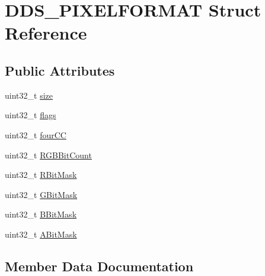 \hypertarget{struct_d_d_s___p_i_x_e_l_f_o_r_m_a_t}{}\section{D\+D\+S\+\_\+\+P\+I\+X\+E\+L\+F\+O\+R\+M\+AT Struct Reference}
\label{struct_d_d_s___p_i_x_e_l_f_o_r_m_a_t}
\subsection*{Public Attributes}
\begin{DoxyCompactItemize}
\item 
uint32\+\_\+t \mbox{\hyperlink{struct_d_d_s___p_i_x_e_l_f_o_r_m_a_t_adb357eb46848e57b8d89b59d31608f6c}{size}}
\item 
uint32\+\_\+t \mbox{\hyperlink{struct_d_d_s___p_i_x_e_l_f_o_r_m_a_t_a1909f63ad2d0a257bf5e8dba9e2d9475}{flags}}
\item 
uint32\+\_\+t \mbox{\hyperlink{struct_d_d_s___p_i_x_e_l_f_o_r_m_a_t_aa7af0012c64480e8eeafa25d7892c310}{four\+CC}}
\item 
uint32\+\_\+t \mbox{\hyperlink{struct_d_d_s___p_i_x_e_l_f_o_r_m_a_t_af53071b3c2912f56e4b54533d8101951}{R\+G\+B\+Bit\+Count}}
\item 
uint32\+\_\+t \mbox{\hyperlink{struct_d_d_s___p_i_x_e_l_f_o_r_m_a_t_a2d2f8c19c50ceb8677b0be2d1090c234}{R\+Bit\+Mask}}
\item 
uint32\+\_\+t \mbox{\hyperlink{struct_d_d_s___p_i_x_e_l_f_o_r_m_a_t_a13f1281d9cb4a6e001541c78d58ead8b}{G\+Bit\+Mask}}
\item 
uint32\+\_\+t \mbox{\hyperlink{struct_d_d_s___p_i_x_e_l_f_o_r_m_a_t_a94e8f580b6c716d600be37525b3ebf44}{B\+Bit\+Mask}}
\item 
uint32\+\_\+t \mbox{\hyperlink{struct_d_d_s___p_i_x_e_l_f_o_r_m_a_t_ada163cba3be6a89fc99166b3d6d49050}{A\+Bit\+Mask}}
\end{DoxyCompactItemize}


\subsection{Member Data Documentation}
\mbox{\label{struct_d_d_s___p_i_x_e_l_f_o_r_m_a_t_ada163cba3be6a89fc99166b3d6d49050}} 
